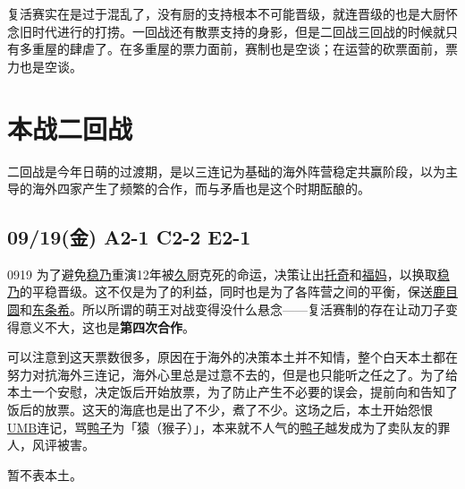 复活赛实在是过于混乱了，没有厨的支持根本不可能晋级，就连晋级的也是大厨怀念旧时代进行的打捞。一回战还有散票支持的身影，但是二回战三回战的时候就只有多重屋的肆虐了。在多重屋的票力面前，赛制也是空谈；在运营的砍票面前，票力也是空谈。

\chapter{本战二回战}

二回战是今年日萌的过渡期，是以三连记为基础的海外阵营稳定共赢阶段，以为主导的海外四家产生了频繁的合作，而与矛盾也是这个时期酝酿的。

\section{09/19(金) A2-1 C2-2 E2-1}


0919 为了避免\uline{稳乃}重演12年被\uline{久}厨克死的命运，决策让出\uline{托奇}和\uline{福妈}，以换取\uline{稳乃}的平稳晋级。这不仅是为了的利益，同时也是为了各阵营之间的平衡，保送\uline{鹿目圆}和\uline{东条希}。所以所谓的萌王对战变得没什么悬念——复活赛制的存在让动刀子变得意义不大，这也是\textbf{第四次合作}。

可以注意到这天票数很多，原因在于海外的决策本土并不知情，整个白天本土都在努力对抗海外三连记，海外心里总是过意不去的，但是也只能听之任之了。为了给本土一个安慰，决定饭后开始放票，为了防止产生不必要的误会，提前向和告知了饭后的放票。这天的海底也是出了不少，煮了不少。这场之后，本土开始怨恨\uline{UMB}连记，骂\uline{鸭子}为「猿（猴子）」，本来就不人气的\uline{鸭子}越发成为了卖队友的罪人，风评被害。

暂不表本土。

